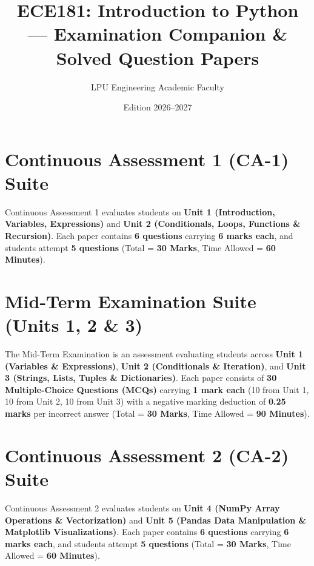 \documentclass[a4paper,11pt,oneside,openany]{book}
\title{ECE181: Introduction to Python --- Examination Companion \& Solved Question Papers}
\author{LPU Engineering Academic Faculty}
\date{Edition 2026--2027}
\begin{document}
\frontmatter




\tableofcontents
\newpage

\mainmatter

\chapter{Continuous Assessment 1 (CA-1) Suite}
\label{chap:ca1}
\noindent
Continuous Assessment 1 evaluates students on \textbf{Unit 1 (Introduction, Variables, Expressions)} and \textbf{Unit 2 (Conditionals, Loops, Functions \& Recursion)}. Each paper contains \textbf{6 questions} carrying \textbf{6 marks each}, and students attempt \textbf{5 questions} (Total = \textbf{30 Marks}, Time Allowed = \textbf{60 Minutes}).

\newpage



\chapter{Mid-Term Examination Suite (Units 1, 2 \& 3)}
\label{chap:midterm}
\noindent
The Mid-Term Examination is an assessment evaluating students across \textbf{Unit 1 (Variables \& Expressions)}, \textbf{Unit 2 (Conditionals \& Iteration)}, and \textbf{Unit 3 (Strings, Lists, Tuples \& Dictionaries)}. Each paper consists of \textbf{30 Multiple-Choice Questions (MCQs)} carrying \textbf{1 mark each} (10 from Unit 1, 10 from Unit 2, 10 from Unit 3) with a negative marking deduction of \textbf{0.25 marks} per incorrect answer (Total = \textbf{30 Marks}, Time Allowed = \textbf{90 Minutes}).

\newpage



\chapter{Continuous Assessment 2 (CA-2) Suite}
\label{chap:ca2}
\noindent
Continuous Assessment 2 evaluates students on \textbf{Unit 4 (NumPy Array Operations \& Vectorization)} and \textbf{Unit 5 (Pandas Data Manipulation \& Matplotlib Visualizations)}. Each paper contains \textbf{6 questions} carrying \textbf{6 marks each}, and students attempt \textbf{5 questions} (Total = \textbf{30 Marks}, Time Allowed = \textbf{60 Minutes}).
\end{document}
